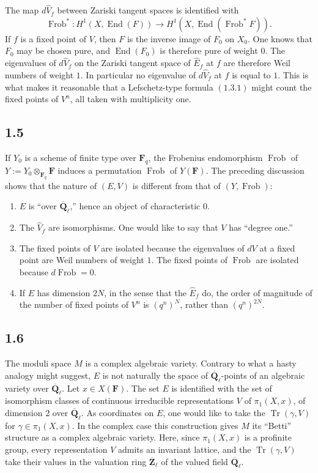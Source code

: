 \documentclass[11pt]{article}
\newcommand{\Qbar}{\overline{\mathbf Q}}
\newcommand{\Fq}{\mathbf F_q}
\newcommand{\F}{\mathbf F}
\newcommand{\Frob}{\operatorname{Frob}}
\newcommand{\Tr}{\operatorname{Tr}}
\newcommand{\End}{\operatorname{End}}
\begin{document}
The map \(d\widehat V_f\) between Zariski tangent spaces is identified with
\[
\Frob^*:H^1(X,\End(F))\longrightarrow H^1(X,\End(\Frob^*F)).
\]
If \(f\) is a fixed point of \(V\), then \(F\) is the inverse image of \(F_0\) on \(X_0\). One knows that \(F_0\) may be chosen pure, and \(\End(F_0)\) is therefore pure of weight \(0\). The eigenvalues of \(d\widehat V_f\) on the Zariski tangent space of \(\widehat E_f\) at \(f\) are therefore Weil numbers of weight \(1\). In particular no eigenvalue of \(d\widehat V_f\) at \(f\) is equal to \(1\). This is what makes it reasonable that a Lefschetz-type formula \((1.3.1)\) might count the fixed points of \(V^n\), all taken with multiplicity one.

\subsection{1.5}
If \(Y_0\) is a scheme of finite type over \(\Fq\), the Frobenius endomorphism \(\Frob\) of \(Y:=Y_0\otimes_{\Fq}\F\) induces a permutation \(\Frob\) of \(Y(\F)\). The preceding discussion shows that the nature of \((E,V)\) is different from that of \((Y,\Frob)\):
\begin{enumerate}[label=(\roman*)]
\item \(E\) is ``over \(\Qbar_\ell\),'' hence an object of characteristic \(0\).
\item The \(\widehat V_f\) are isomorphisms. One would like to say that \(V\) has ``degree one.''
\item The fixed points of \(V\) are isolated because the eigenvalues of \(dV\) at a fixed point are Weil numbers of weight \(1\). The fixed points of \(\Frob\) are isolated because \(d\Frob=0\).
\item If \(E\) has dimension \(2N\), in the sense that the \(\widehat E_f\) do, the order of magnitude of the number of fixed points of \(V^n\) is \((q^n)^N\), rather than \((q^n)^{2N}\).
\end{enumerate}

\subsection{1.6}
The moduli space \(M\) is a complex algebraic variety. Contrary to what a hasty analogy might suggest, \(E\) is not naturally the space of \(\Qbar_\ell\)-points of an algebraic variety over \(\Qbar_\ell\). Let \(x\in X(\F)\). The set \(E\) is identified with the set of isomorphism classes of continuous irreducible representations \(V\) of \(\pi_1(X,x)\), of dimension \(2\) over \(\Qbar_\ell\). As coordinates on \(E\), one would like to take the \(\Tr(\gamma,V)\) for \(\gamma\in\pi_1(X,x)\). In the complex case this construction gives \(M\) its ``Betti'' structure as a complex algebraic variety. Here, since \(\pi_1(X,x)\) is a profinite group, every representation \(V\) admits an invariant lattice, and the \(\Tr(\gamma,V)\) take their values in the valuation ring \(\overline{\mathbf Z}_\ell\) of the valued field \(\Qbar_\ell\).
\end{document}
